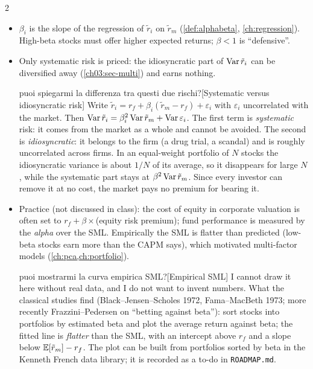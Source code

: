 \begin{paracol}{2}
\begin{finance}
\begin{itemize}
  \item $\beta_i$ is the slope of the regression of $\tilde r_i$ on $\tilde r_m$  (\cref{def:alphabeta},
        \cref{ch:regression}). High-beta stocks must offer higher expected returns; $\beta<1$ is ``defensive''.
  \item Only systematic risk is priced: the idiosyncratic part of $\operatorname{Var}\tilde r_i$ can be diversified away
        (\cref{ch03:sec-multi}) and earns nothing.\begin{answer}{puoi spiegarmi la differenza tra questi due rischi?}[Systematic versus idiosyncratic risk]
Write $\tilde r_i=r_f+\beta_i(\tilde r_m-r_f)+\varepsilon_i$ with $\varepsilon_i$ uncorrelated with the market. Then
$\operatorname{Var}\tilde r_i=\beta_i^2\operatorname{Var}\tilde r_m+\operatorname{Var}\varepsilon_i$. The first term is \emph{systematic} risk: it comes from the market as a whole and cannot be avoided. The second
is \emph{idiosyncratic}: it belongs to the firm (a drug trial, a scandal) and is roughly uncorrelated across firms. In an equal-weight portfolio of $N$ stocks the idiosyncratic
variance is about $1/N$ of its average, so it disappears for large $N$, while the systematic part stays at $\beta^2\operatorname{Var}\tilde r_m$. Since every investor can remove it at no cost, the market
pays no premium for bearing it.
\end{answer}
  \item Practice (not discussed in class): the cost of equity in corporate valuation is often set to
        $r_f+\beta\times$(equity risk premium); fund performance is measured by the \emph{alpha} over the SML.
        Empirically the SML is flatter than predicted (low-beta stocks earn more than the CAPM says), which
        motivated multi-factor models (\cref{ch:pca,ch:portfolio}).\begin{answer}{puoi mostrarmi la curva empirica SML?}[Empirical SML]
I cannot draw it here without real data, and I do not want to invent numbers. What the classical studies find (Black--Jensen--Scholes 1972,
Fama--MacBeth 1973; more recently Frazzini--Pedersen on ``betting against beta''): sort stocks into portfolios by estimated beta and plot the average return against beta;
the fitted line is \emph{flatter} than the SML, with an intercept above $r_f$ and a slope below $\mathbb{E}[\tilde r_m]-r_f$. The plot can be built from portfolios sorted by beta in
the Kenneth French data library; it is recorded as a to-do in \texttt{ROADMAP.md}.
\end{answer}
\end{itemize}
\end{finance}


\end{paracol}
